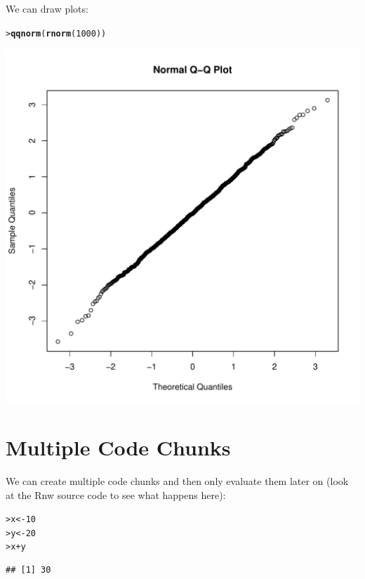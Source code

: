 \documentclass[12pt]{article}\usepackage[]{graphicx}\usepackage[]{xcolor}
\makeatletter
\def\maxwidth{ %
  \ifdim\Gin@nat@width>\linewidth
    \linewidth
  \else
    \Gin@nat@width
  \fi
}
\newcommand{\hlnum}[1]{\textcolor[rgb]{0.686,0.059,0.569}{#1}}%
\newcommand{\hlopt}[1]{\textcolor[rgb]{0,0,0}{#1}}%
\newcommand{\hlstd}[1]{\textcolor[rgb]{0.345,0.345,0.345}{#1}}%
\newcommand{\hlkwb}[1]{\textcolor[rgb]{0.69,0.353,0.396}{#1}}%
\newcommand{\hlkwd}[1]{\textcolor[rgb]{0.737,0.353,0.396}{\textbf{#1}}}%
\newenvironment{kframe}{%
 \def\at@end@of@kframe{}%
 \ifinner\ifhmode%
  \def\at@end@of@kframe{\end{minipage}}%
  \begin{minipage}{\columnwidth}%
 \fi\fi%
 \def\FrameCommand##1{\hskip\@totalleftmargin \hskip-\fboxsep
 \colorbox{shadecolor}{##1}\hskip-\fboxsep
     \hskip-\linewidth \hskip-\@totalleftmargin \hskip\columnwidth}%
 \MakeFramed {\advance\hsize-\width
   \@totalleftmargin\z@ \linewidth\hsize
   \@setminipage}}%
 {\par\unskip\endMakeFramed%
 \at@end@of@kframe}
\newenvironment{knitrout}{}{} %
\makeatother
\begin{document}
We can draw plots:

\begin{knitrout}
\color{fgcolor}\begin{kframe}
\begin{alltt}
\hlstd{> }\hlkwd{qqnorm}\hlstd{(}\hlkwd{rnorm}\hlstd{(}\hlnum{1000}\hlstd{))}
\end{alltt}
\end{kframe}
\includegraphics[width=\maxwidth]{figure/unnamed-chunk-8-1} 
\end{knitrout}


\newpage


\section{Multiple Code Chunks}

We can create multiple code chunks and then only evaluate them later on
(look at the Rnw source code to see what happens here):





\begin{knitrout}
\color{fgcolor}\begin{kframe}
\begin{alltt}
\hlstd{> }\hlstd{x} \hlkwb{<-} \hlnum{10}
\hlstd{> }\hlstd{y} \hlkwb{<-} \hlnum{20}
\hlstd{> }\hlstd{x} \hlopt{+} \hlstd{y}
\end{alltt}
\begin{verbatim}
## [1] 30
\end{verbatim}
\end{kframe}
\end{knitrout}
\end{document}
